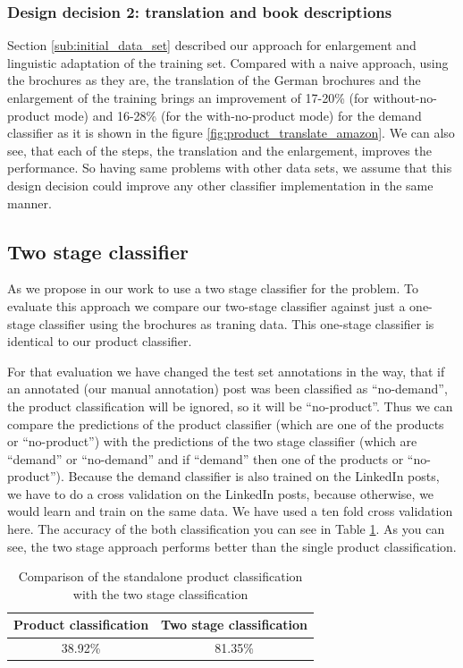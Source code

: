 \subsubsection{Design decision 2: translation and book descriptions}
Section \ref{sub:initial_data_set} described our approach for enlargement and linguistic adaptation of the training set.
Compared with a naive approach, using the brochures as they are, the translation of the German brochures and the enlargement of the training brings an improvement of 17-20\% (for without-no-product mode) and 16-28\% (for the with-no-product mode) for the demand classifier as it is shown in the figure \ref{fig:product_translate_amazon}.
We can also see, that each of the steps, the translation and the enlargement, improves the performance.
So having same problems with other data sets, we assume that this design decision could improve any other classifier implementation in the same manner.

\subsection{Two stage classifier}
\label{sub:two_stage_classifier}

As we propose in our work to use a two stage classifier for the \nto problem.
To evaluate this approach we compare our two-stage classifier against just a one-stage classifier using the brochures as traning data.
This one-stage classifier is identical to our product classifier.

For that evaluation we have changed the test set annotations in the way, that if an annotated (our manual annotation) post was been classified as ``no-demand'', the product classification will be ignored, so it will be ``no-product''.
Thus we can compare the predictions of the product classifier (which are one of the products or ``no-product'') with the predictions of the two stage classifier (which are ``demand'' or ``no-demand'' and if ``demand'' then one of the products or ``no-product'').
Because the demand classifier is also trained on the LinkedIn posts, we have to do a cross validation on the LinkedIn posts, because otherwise, we would learn and train on the same data.
We have used a ten fold cross validation here.
The accuracy of the both classification you can see in Table \ref{table:two_stage_eval}.
As you can see, the two stage approach performs better than the single product classification.

\begin{table}
	\centering
	\begin{tabular}{c|c}
		\hline
		Product classification & Two stage classification \\ \hline \hline
		38.92\% & 81.35\% \\ \hline
	\end{tabular}
	\caption{Comparison of the standalone product classification with the two stage classification}
	\label{table:two_stage_eval}
\end{table}

